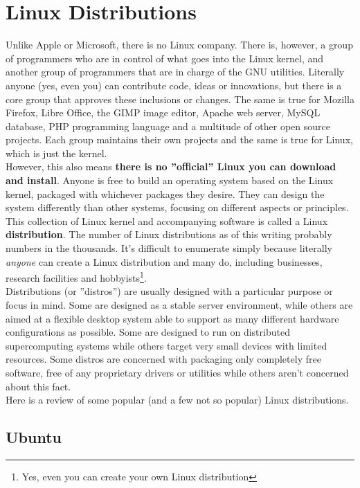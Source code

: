 \section{Linux Distributions}

Unlike Apple or Microsoft, there is no Linux company. There is, however, a group of programmers who are in control of what goes into the Linux kernel, and another group of programmers that are in charge of the GNU utilities.  Literally anyone (yes, even you) can contribute code, ideas or innovations, but there is a core group that approves these inclusions or changes.  The same is true for Mozilla Firefox, Libre Office, the GIMP image editor, Apache web server, MySQL database, PHP programming language and a multitude of other open source projects.  Each group maintains their own projects and the same is true for Linux, which is just the kernel.\\

However, this also means \textbf{there is no ''official'' Linux you can download and install}.  Anyone is free to build an operating system based on the Linux kernel, packaged with whichever packages they desire.  They can design the system differently than other systems, focusing on different aspects or principles.  This collection of Linux kernel and accompanying software is called a Linux \textbf{distribution}.  The number of Linux distributions as of this writing probably numbers in the thousands.  It's difficult to enumerate simply because literally \textit{anyone} can create a Linux distribution and many do, including businesses, research facilities and hobbyists\footnote{Yes, even you can create your own Linux distribution}.\\

Distributions (or ''distros'') are usually designed with a particular purpose or focus in mind.  Some are designed as a stable server environment, while others are aimed at a flexible desktop system able to support as many different hardware configurations as possible.  Some are designed to run on distributed supercomputing systems while others target very small devices with limited resources.  Some distros are concerned with packaging only completely free software, free of any proprietary drivers or utilities while others aren't concerned about this fact.\\

Here is a review of some popular (and a few not so popular) Linux distributions.

\subsection{Ubuntu}

